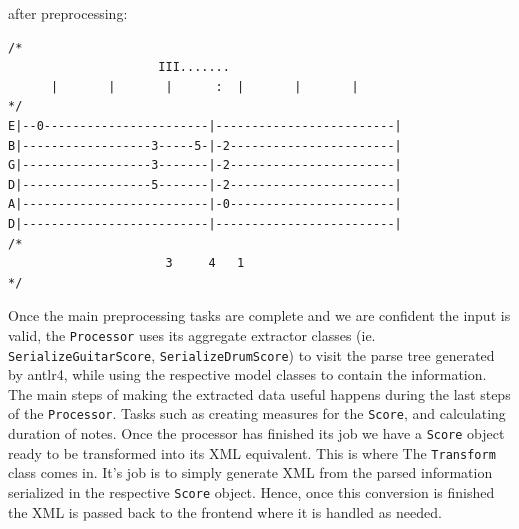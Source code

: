 \documentclass[11pt]{article}
\begin{document}
after preprocessing:
\begin{verbatim}
/*
	                 III.......
	  |       |       |      :  |       |       |
*/
E|--0-----------------------|-------------------------|
B|------------------3-----5-|-2-----------------------|
G|------------------3-------|-2-----------------------|
D|------------------5-------|-2-----------------------|
A|--------------------------|-0-----------------------|
D|--------------------------|-------------------------|
/*
	                  3     4   1
*/
\end{verbatim}

Once the main preprocessing tasks are complete and we are confident the input is valid, the \texttt{Processor} uses its aggregate extractor classes (ie. \texttt{SerializeGuitarScore}, \texttt{SerializeDrumScore}) to visit the parse tree generated by antlr4, while using the respective model classes to contain the information. The main steps of making the extracted data useful happens during the last steps of the \texttt{Processor}. Tasks such as creating measures for the \texttt{Score}, and calculating duration of notes. Once the processor has finished its job we have a \texttt{Score} object ready to be transformed into its XML equivalent. This is where The \texttt{Transform} class comes in. It's job is to simply generate XML from the parsed information serialized in the respective \texttt{Score} object. Hence, once this conversion is finished the XML is passed back to the frontend where it is handled as needed.
\end{document}

